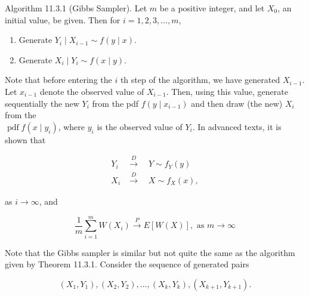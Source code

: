 Algorithm 11.3.1 (Gibbs Sampler). Let $m$ be a positive integer, and let $X_{0}$, an initial value, be given. Then for $i=1,2,3, \ldots, m$,

\begin{enumerate}
  \item Generate $Y_{i} \mid X_{i-1} \sim f(y \mid x)$.
  \item Generate $X_{i} \mid Y_{i} \sim f(x \mid y)$.
\end{enumerate}

Note that before entering the $i$ th step of the algorithm, we have generated $X_{i-1}$. Let $x_{i-1}$ denote the observed value of $X_{i-1}$. Then, using this value, generate sequentially the new $Y_{i}$ from the pdf $f\left(y \mid x_{i-1}\right)$ and then draw (the new) $X_{i}$ from the\\
$\operatorname{pdf} f\left(x \mid y_{i}\right)$, where $y_{i}$ is the observed value of $Y_{i}$. In advanced texts, it is shown that


\begin{align*}
Y_{i} & \xrightarrow{D} \quad Y \sim f_{Y}(y) \\
X_{i} & \xrightarrow{D} \quad X \sim f_{X}(x), \tag{11.3.8}
\end{align*}


as $i \rightarrow \infty$, and


\begin{equation*}
\frac{1}{m} \sum_{i=1}^{m} W\left(X_{i}\right) \xrightarrow{P} E[W(X)], \text { as } m \rightarrow \infty \tag{11.3.9}
\end{equation*}


Note that the Gibbs sampler is similar but not quite the same as the algorithm given by Theorem 11.3.1. Consider the sequence of generated pairs

$$
\left(X_{1}, Y_{1}\right),\left(X_{2}, Y_{2}\right), \ldots,\left(X_{k}, Y_{k}\right),\left(X_{k+1}, Y_{k+1}\right) .
$$

